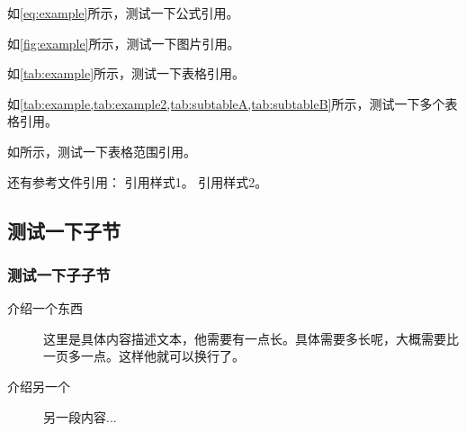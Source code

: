 如\cref{eq:example}所示，测试一下公式引用。

如\cref{fig:example}所示，测试一下图片引用。

如\cref{tab:example}所示，测试一下表格引用。

如\cref{tab:example,tab:example2,tab:subtableA,tab:subtableB}所示，测试一下多个表格引用。

如所示，测试一下表格范围引用。

还有参考文件引用：
引用样式1\cite{example2025}。
引用样式2\parencite{example2025}。

\subsection{测试一下子节}
\subsubsection{测试一下子子节}

\begin{description}
    \item[介绍一个东西] 这里是具体内容描述文本，他需要有一点长。具体需要多长呢，大概需要比一页多一点。这样他就可以换行了。
    \item[介绍另一个] 另一段内容...
\end{description}
